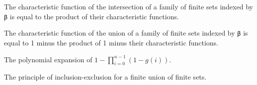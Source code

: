 \begin{lemma}\label{char_fun_FinInter}
  The characteristic function of the intersection of a family of finite sets indexed by \verb|β| is equal to the product of their characteristic functions.
\end{lemma}

\begin{lemma}\label{char_fun_FinUnion}
  The characteristic function of the union of a family of finite sets indexed by \verb|β| is equal to 1 minus the product of 1 minus their characteristic functions.
\end{lemma}

\begin{lemma}\label{mul_expand₀}
  The polynomial expansion of \(1 - \prod_{i=0}^{n-1} (1 - g(i))\).
\end{lemma}

\begin{theorem}\label{Principle_of_Inclusion_Exclusion}
  The principle of inclusion-exclusion for a finite union of finite sets.
\end{theorem}

